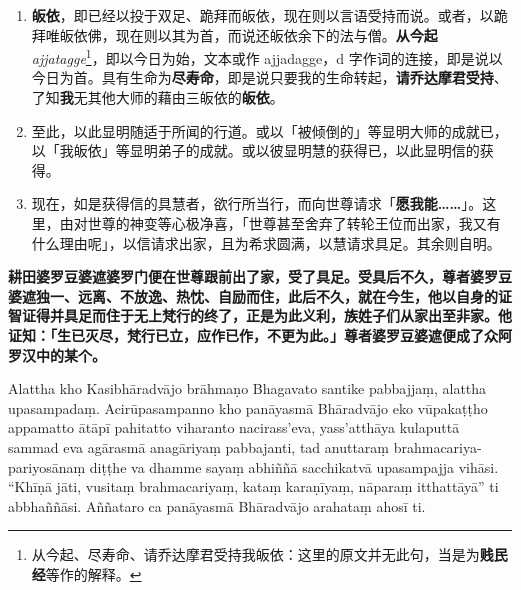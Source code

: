 \begin{enumerate}
\item \textbf{皈依}，即已经以投于双足、跪拜而皈依，现在则以言语受持而说。或者，以跪拜唯皈依佛，现在则以其为首，而说还皈依余下的法与僧。\textbf{从今起} \textit{ajjatagge}\footnote{从今起、尽寿命、请乔达摩君受持我皈依：这里的原文并无此句，当是为\textbf{贱民经}等作的解释。}，即以今日为始，文本或作 ajjadagge，d 字作词的连接，即是说以今日为首。具有生命为\textbf{尽寿命}，即是说只要我的生命转起，\textbf{请乔达摩君受持}、了知\textbf{我}无其他大师的藉由三皈依的\textbf{皈依}。
\item 至此，以此显明随适于所闻的行道。或以「被倾倒的」等显明大师的成就已，以「我皈依」等显明弟子的成就。或以彼显明慧的获得已，以此显明信的获得。
\item 现在，如是获得信的具慧者，欲行所当行，而向世尊请求「\textbf{愿我能……}」。这里，由对世尊的神变等心极净喜，「世尊甚至舍弃了转轮王位而出家，我又有什么理由呢」，以信请求出家，且为希求圆满，以慧请求具足。其余则自明。\end{enumerate}

\textbf{耕田婆罗豆婆遮婆罗门便在世尊跟前出了家，受了具足。受具后不久，尊者婆罗豆婆遮独一、远离、不放逸、热忱、自励而住，此后不久，就在今生，他以自身的证智证得并具足而住于无上梵行的终了，正是为此义利，族姓子们从家出至非家。他证知：「生已灭尽，梵行已立，应作已作，不更为此。」尊者婆罗豆婆遮便成了众阿罗汉中的某个。}

Alattha kho Kasibhāradvājo brāhmaṇo Bhagavato santike pabbajjaṃ, alattha upasampadaṃ. Acirūpasampanno kho panāyasmā Bhāradvājo eko vūpakaṭṭho appamatto ātāpī pahitatto viharanto nacirass’eva, yass’atthāya kulaputtā sammad eva agārasmā anagāriyaṃ pabbajanti, tad anuttaraṃ brahmacariya-pariyosānaṃ diṭṭhe va dhamme sayaṃ abhiññā sacchikatvā upasampajja vihāsi. “Khīṇā jāti, vusitaṃ brahmacariyaṃ, kataṃ karaṇīyaṃ, nāparaṃ itthattāyā” ti abbhaññāsi. Aññataro ca panāyasmā Bhāradvājo arahataṃ ahosī ti.

